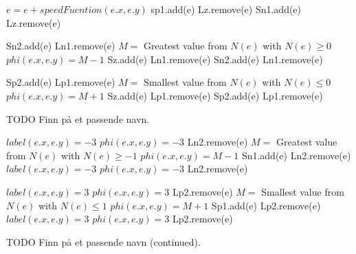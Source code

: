 \begin{algorithm}[h!]
\begin{algorithmic}[1] %
	\State $e = e + speedFucntion(e.x, e.y)$
	 
		\State sp1.add(e)
		\State Lz.remove(e)
		\State Sn1.add(e)
		\State Lz.remove(e)
	\EndIf
\EndFor

		\State Sn2.add(e)
		\State Ln1.remove(e)
	\Else
		\State $M =$ Greatest value from $N(e)$ with $N(e) \geq 0$ 
		\Statex {}
		\State $phi(e.x, e.y) = M-1$
			\State Sz.add(e)
			\State Ln1.remove(e)
			\State Sn2.add(e)
			\State Ln1.remove(e)
		\EndIf
	\EndIf
\EndFor
			
		\State Sp2.add(e)
		\State Lp1.remove(e)
	\Else
		\State $M =$ Smallest value from $N(e)$ with $N(e) \leq 0$ 
		\State $phi(e.x, e.y) = M+1$
			\State Sz.add(e)
			\State Lp1.remove(e)
			\State Sp2.add(e)
			\State Lp1.remove(e)
		\EndIf
	\EndIf
\EndFor
\end{algorithmic}
\caption{TODO Finn på et passende navn.}
\label{prepareUpdates}
\end{algorithm}

\begin{algorithm}[h!]
\begin{algorithmic}[1] %
		\State $label(e.x, e.y) = -3$
		\State $phi(e.x, e.y) = -3$
		\State Ln2.remove(e)
	\Else
		\State $M =$ Greatest value from $N(e)$ with $N(e) \geq -1$ 
		\State $phi(e.x, e.y) = M-1$
			\State Sn1.add(e)
			\State Ln2.remove(e)
			\State $label(e.x, e.y) = -3$
			\State $phi(e.x, e.y) = -3$
			\State Ln2.remove(e)
		\EndIf
	\EndIf
\EndFor

		\State $label(e.x, e.y) = 3$
		\State $phi(e.x, e.y) = 3$
		\State Lp2.remove(e)
	\Else
		\State $M =$ Smallest value from $N(e)$ with $N(e) \leq 1$ 
		\State $phi(e.x, e.y) = M+1$
			\State Sp1.add(e)
			\State Lp2.remove(e)
			\State $label(e.x, e.y) = 3$
			\State $phi(e.x, e.y) = 3$
			\State Lp2.remove(e)
		\EndIf
	\EndIf
\EndFor

\end{algorithmic}
\caption{TODO Finn på et passende navn (continued).}
\label{prepareUpdates2}
\end{algorithm}

